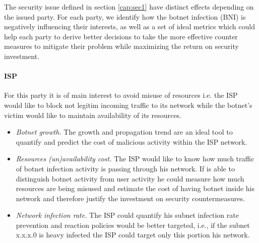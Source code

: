 The security issue defined in section \ref{cap:sec1} have distinct effects depending on the issued party.
For each party, we identify how the botnet infection (BNI) is negatively influencing their interests, as well as a set of ideal metrics which could help each party to derive better decisions to take the more effective counter measures to mitigate their problem while maximizing the return on security investment.

\indent
\paragraph{ISP}
For this party it is of main interest to avoid misuse of resources i.e. the ISP would like to block not legitim incoming traffic to its network while the botnet's victim would like to maintain availability of its resources.
\begin{itemize}
    \item \textit{Botnet growth.} The growth and propagation trend are an ideal tool to quantify and predict the cost of malicious activity within the ISP network.
    \item \textit{Resources (un)availability cost.} The ISP would like to know how much traffic of botnet infection activity is passing through his network. If is able to distinguish botnet activity from user activity he could measure how much resources are being misused and estimate the cost of having botnet inside his network and therefore justify the investment on security countermeasures.
    \item \textit{Network infection rate.} The ISP could quantify his subnet infection rate prevention and reaction policies would be better targeted, i.e., if the subnet x.x.x.0 is heavy infected the ISP could target only this portion his network.
\end{itemize}
\indent

